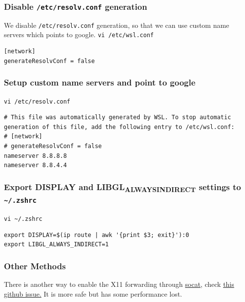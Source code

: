 \documentclass[10pt]{article}
\begin{document}
\subsubsection{Disable \texttt{/etc/resolv.conf} generation}
\label{sec:org4d8090e}
We disable \texttt{/etc/resolv.conf} generation, so that we can use custom name servers which points to google.
\texttt{vi /etc/wsl.conf}
\begin{verbatim}
[network]
generateResolvConf = false
\end{verbatim}

\subsubsection{Setup custom name servers and point to google}
\label{sec:org9002267}
\texttt{vi /etc/resolv.conf}
\begin{verbatim}
# This file was automatically generated by WSL. To stop automatic generation of this file, add the following entry to /etc/wsl.conf:
# [network]
# generateResolvConf = false
nameserver 8.8.8.8
nameserver 8.8.4.4
\end{verbatim}

\subsubsection{Export DISPLAY and LIBGL\textsubscript{ALWAYS}\textsubscript{INDIRECT} settings to \texttt{\textasciitilde{}/.zshrc}}
\label{sec:org01a75c0}
\texttt{vi \textasciitilde{}/.zshrc}
\begin{verbatim}
export DISPLAY=$(ip route | awk '{print $3; exit}'):0
export LIBGL_ALWAYS_INDIRECT=1
\end{verbatim}

\subsubsection{Other Methods}
\label{sec:orgd4d334b}
There is another way to enable the X11 forwarding through \href{https://github.com/microsoft/WSL/issues/4619\#issuecomment-678652118}{socat}, check \href{https://github.com/microsoft/WSL/issues/4619\#issuecomment-678652118}{this github issue.} It is more safe but has some performance lost.
\end{document}
